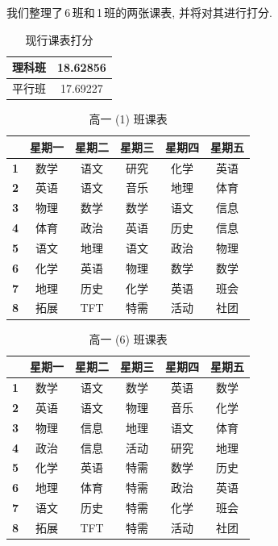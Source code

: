 \documentclass[a4paper]{article}
\begin{document}
 我们整理了\,6\,班和\,1\,班的两张课表, 并将对其进行打分.\par
 \begin{table}[H]
 \centering
 \begin{tabular}{|c|c|}
 \hline
 理科班 & 18.62856 \\\hline
 平行班 & 17.69227 \\\hline
 \end{tabular}
 \caption{现行课表打分}
 \end{table}
 \begin{table}[H]
 \centering
 \begin{tabular}{|c|c|c|c|c|c|}
 \hline
 & \bf 星期一 & \bf 星期二 & \bf 星期三 & \bf 星期四 & \bf 星期五 \\\hline
 \bf 1 & 数学 & 语文 & 研究 & 化学 & 英语 \\\hline
 \bf 2 & 英语 & 语文 & 音乐 & 地理 & 体育 \\\hline
 \bf 3 & 物理 & 数学 & 数学 & 语文 & 信息 \\\hline
 \bf 4 & 体育 & 政治 & 英语 & 历史 & 信息 \\\hline
 \bf 5 & 语文 & 地理 & 语文 & 政治 & 物理 \\\hline
 \bf 6 & 化学 & 英语 & 物理 & 数学 & 数学 \\\hline
 \bf 7 & 地理 & 历史 & 化学 & 英语 & 班会 \\\hline
 \bf 8 & 拓展 & TFT  & 特需 & 活动 & 社团 \\\hline
 \end{tabular}
 \caption{高一 (1) 班课表}
 \end{table}
 \begin{table}[H]
 \centering
 \begin{tabular}{|c|c|c|c|c|c|}
 \hline
 & \bf 星期一 & \bf 星期二 & \bf 星期三 & \bf 星期四 & \bf 星期五 \\\hline
 \bf 1 & 数学 & 语文 & 数学 & 英语 & 数学 \\\hline
 \bf 2 & 英语 & 语文 & 物理 & 音乐 & 化学 \\\hline
 \bf 3 & 物理 & 信息 & 地理 & 语文 & 体育 \\\hline
 \bf 4 & 政治 & 信息 & 活动 & 研究 & 地理 \\\hline
 \bf 5 & 化学 & 英语 & 特需 & 数学 & 历史 \\\hline
 \bf 6 & 地理 & 体育 & 特需 & 政治 & 英语 \\\hline
 \bf 7 & 语文 & 历史 & 特需 & 化学 & 班会 \\\hline
 \bf 8 & 拓展 & TFT  & 特需 & 活动 & 社团 \\\hline
 \end{tabular}
 \caption{高一 (6) 班课表}
 \end{table}
\end{document}
